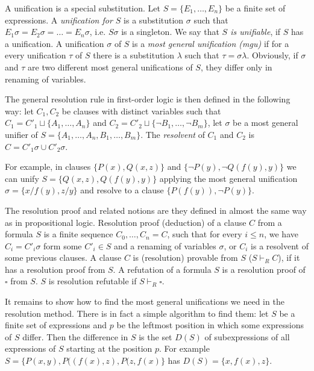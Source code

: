 A unification is a special substitution. Let $S = \{E_1, \dots, E_n\}$ be a finite set of expressions. A \emph{unification for $S$} is a substitution $\sigma$ such that $E_1 \sigma = E_2 \sigma = \dots = E_n \sigma$, i.e. $S \sigma$ is a singleton. We say that \emph{$S$ is unifiable}, if $S$ has a unification. A unification $\sigma$ of $S$ is a \emph{most general unification (mgu)} if for a every unification $\tau$ of $S$ there is a substitution $\lambda$ such that $\tau = \sigma \lambda$. Obviously, if $\sigma$ and $\tau$ are two different most general unifications of $S$, they differ only in renaming of variables.

The general resolution rule in first-order logic is then defined in the following way: let $C_1, C_2$ be clauses with distinct variables such that $C_1 = C'_1 \sqcup \{A_1, \dots, A_n\}$ and $C_2 = C'_2 \sqcup \{\neg B_1, \dots, \neg B_m\}$, let $\sigma$ be a most general unifier of $S = \{A_1, \dots, A_n, B_1, \dots, B_m\}$. The \emph{resolvent} of $C_1$ and $C_2$ is $C = C'_1 \sigma \cup C'_2 \sigma$.

For example, in clauses $\{P(x), Q(x,z)\}$ and $\{\neg P(y), \neg Q(f(y), y)\}$ we can unify $S = \{Q(x,z), Q(f(y),y)\}$ applying the most general unification $\sigma = \{x/f(y), z/y\}$ and resolve to a clause $\{P(f(y)), \neg P(y)\}$.

The resolution proof and related notions are they defined in almost the same way as in propositional logic. Resolution proof (deduction) of a clause $C$ from a formula $S$ is a finite sequence $C_0, \dots, C_n = C$, such that for every $i \leq n$, we have $C_i = C'_i \sigma$ form some $C'_i \in S$ and a renaming of variables $\sigma$, or $C_i$ is a resolvent of some previous clauses. A clause $C$ is (resolution) provable from $S$ ($S \vdash_R C$), if it has a resolution proof from $S$. A refutation of a formula $S$ is a resolution proof of $\square$ from $S$. $S$ is resolution refutable if $S \vdash_R \square$.

It remains to show how to find the most general unifications we need in the resolution method. There is in fact a simple algorithm to find them: let $S$ be a finite set of expressions and $p$ be the leftmost position in which some expressions of $S$ differ. Then the difference in $S$ is the set $D(S)$ of subexpressions of all expressions of $S$ starting at the position $p$. For example $S = \{P(x,y), P((f(x), z), P(z, f(x)\}$ has $D(S) = \{x, f(x), z\}$.

